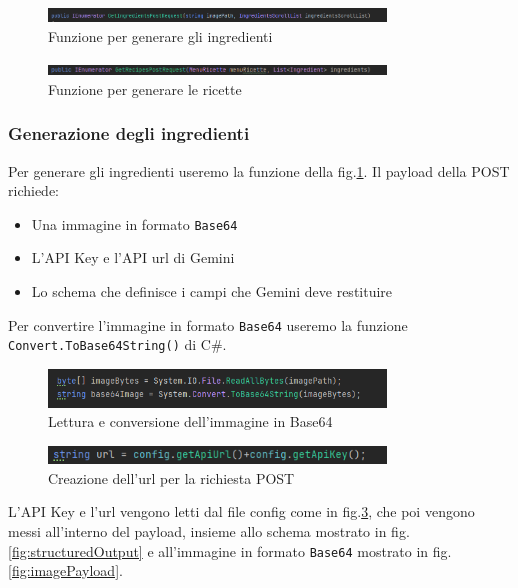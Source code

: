 \begin{figure}[H]
    \centering
    \includegraphics[width=0.8\textwidth,height=\textheight,keepaspectratio]{figures/chapter_1/GetIngredientsPostRequest.png}
    \caption{Funzione per generare gli ingredienti}
    \label{fig:getIngredientsPostRequest}
\end{figure}

\begin{figure}[H]
    \centering
    \includegraphics[width=0.8\textwidth,height=\textheight,keepaspectratio]{figures/chapter_1/GetRecipesPostRequest.png}
    \caption{Funzione per generare le ricette}
    \label{fig:getRecipesPostRequest}
\end{figure}

\subsubsection{Generazione degli ingredienti}
Per generare gli ingredienti useremo la funzione della fig.\ref{fig:getIngredientsPostRequest}. Il payload della  POST richiede: 
\begin{itemize}
    \item Una immagine in formato \texttt{Base64}
    \item L'API Key e l'API url di Gemini
    \item Lo schema che definisce i campi che Gemini deve restituire
\end{itemize}

Per convertire l'immagine in formato \texttt{Base64} useremo la funzione \texttt{Convert.ToBase64String()} di C\#. 
\begin{figure}[H]
    \centering
    \includegraphics[width=0.8\textwidth,height=\textheight,keepaspectratio]{figures/chapter_1/base64.png}
    \caption{Lettura e conversione dell'immagine in Base64}
\end{figure}
\begin{figure}[H]
    \centering
    \includegraphics[width=0.8\textwidth,height=\textheight,keepaspectratio]{figures/chapter_1/APIkey.png}
    \caption{Creazione dell'url per la richiesta POST}
    \label{fig:apiKey}
\end{figure}
L'API Key e l'url vengono letti dal file config come in fig.\ref{fig:apiKey}, che poi vengono messi all'interno del payload, insieme allo schema mostrato in fig.\ref{fig:structuredOutput} e all'immagine in formato \texttt{Base64} mostrato in fig.\ref{fig:imagePayload}.

